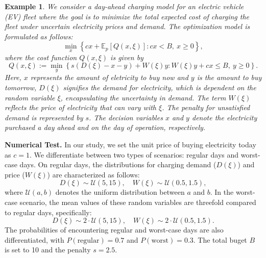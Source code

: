 \documentclass[11pt]{article}
\newtheorem{eg}[thm]{Example}
\begin{document}
	\begin{eg}
	We consider a day-ahead charging model for an electric vehicle (EV) fleet where the goal is to minimize the total expected cost of charging the fleet under uncertain electricity prices and demand. The optimization model is formulated as follows:
	\begin{equation}
		\min_x \left\{ cx + \mathbb{E}_p[Q(x, \xi)] : cx < B, \ x \geq 0 \right\},
	\end{equation}
	where the cost function $Q(x, \xi)$ is given by
	\begin{equation}
		Q(x, \xi) := \min_y \left\{ s(D(\xi) - x - y) + W(\xi)y : W(\xi)y + cx \leq B, \ y \geq 0 \right\}.
	\end{equation}
	Here, $x$ represents the amount of eletricity to buy now and $y$ is the amount to buy tomorrow,   \( D(\xi) \) signifies the demand for electricity, which is dependent on the random variable \( \xi \), encapsulating the uncertainty in demand. The term \( W(\xi) \) reflects the price of electricity that can vary with \( \xi \). The penalty for unsatisfied demand is represented by \( s \). The decision variables \( x \) and \( y \) denote the electricity purchased a day ahead and on the day of operation, respectively.
	\end{eg}	
	
\noindent\textbf{{Numerical Test}.}
In our study, we set the unit price of buying electricity today as $c=1$. We differentiate between two types of scenarios: regular days and worst-case days. On regular days, the distributions for charging demand ($D(\xi)$) and price ($W(\xi)$) are characterized as follows:
\[
D(\xi) \sim \mathcal{U}(5,15), \quad W(\xi) \sim \mathcal{U}(0.5,1.5),
\]
where $\mathcal{U}(a,b)$ denotes the uniform distribution between $a$ and $b$. In the worst-case scenario, the mean values of these random variables are threefold compared to regular days, specifically:
\[
D(\xi) \sim 2\cdot\mathcal{U}(5,15), \quad W(\xi) \sim 2\cdot\mathcal{U}(0.5,1.5).
\]
The probabilities of encountering regular and worst-case days are also differentiated, with $P(\text{regular}) = 0.7$ and $P(\text{worst}) = 0.3$. The total buget $B$ is set to 10 and the penalty $s = 2.5$.

\end{document}
